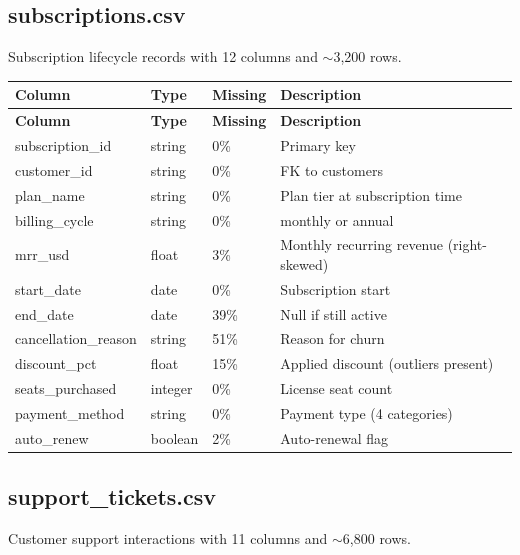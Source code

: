 \documentclass[11pt,a4paper]{article}
\begin{document}
\subsection{subscriptions.csv}

Subscription lifecycle records with 12 columns and $\sim$3,200 rows.

\begin{center}
\begin{longtable}{lllp{5.5cm}}
    \toprule
    \textbf{Column} & \textbf{Type} & \textbf{Missing} & \textbf{Description} \\
    \midrule
    \endfirsthead
    \toprule
    \textbf{Column} & \textbf{Type} & \textbf{Missing} & \textbf{Description} \\
    \midrule
    \endhead
    subscription\_id     & string  & 0\%  & Primary key \\
    customer\_id         & string  & 0\%  & FK to customers \\
    plan\_name           & string  & 0\%  & Plan tier at subscription time \\
    billing\_cycle       & string  & 0\%  & monthly or annual \\
    mrr\_usd             & float   & 3\%  & Monthly recurring revenue (right-skewed) \\
    start\_date          & date    & 0\%  & Subscription start \\
    end\_date            & date    & 39\% & Null if still active \\
    cancellation\_reason & string  & 51\% & Reason for churn \\
    discount\_pct        & float   & 15\% & Applied discount (outliers present) \\
    seats\_purchased     & integer & 0\%  & License seat count \\
    payment\_method      & string  & 0\%  & Payment type (4 categories) \\
    auto\_renew          & boolean & 2\%  & Auto-renewal flag \\
    \bottomrule
\end{longtable}
\end{center}

\subsection{support\_tickets.csv}

Customer support interactions with 11 columns and $\sim$6,800 rows.
\end{document}
